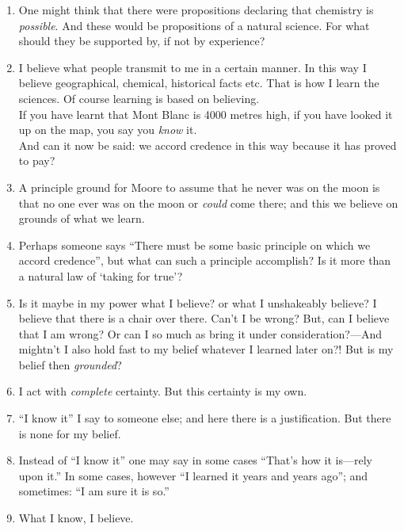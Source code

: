 \documentclass{book}
\begin{document}
\begin{enumerate}
\item
One might think that there were propositions declaring that chemistry is
\emph{possible}. And these would be propositions of a natural science. For what
should they be supported by, if not by experience?

\item
I believe what people transmit to me in a certain manner. In this way I believe
geographical, chemical, historical facts etc. That is how I learn the sciences.
Of course learning is based on believing. \\
If you have learnt that Mont Blanc is 4000 metres high, if you have looked it
up on the map, you say you \emph{know} it. \\
And can it now be said: we accord credence in this way because it has proved to
pay?

\item
A principle ground for Moore to assume that he never was on the moon is that no
one ever was on the moon or \emph{could} come there; and this we believe on
grounds of what we learn.

\item
Perhaps someone says ``There must be some basic principle on which we accord
credence'', but what can such a principle accomplish? Is it more than a natural
law of `taking for true'?

\item
Is it maybe in my power what I believe? or what I unshakeably believe?  I
believe that there is a chair over there. Can't I be wrong? But, can I believe
that I am wrong? Or can I so much as bring it under consideration?---And
mightn't I also hold fast to my belief whatever I learned later on?! But is my
belief then \emph{grounded}?

\item
I act with \emph{complete} certainty. But this certainty is my own.

\item
``I know it'' I say to someone else; and here there is a justification. But
there is none for my belief.

\item
Instead of ``I know it'' one may say in some cases ``That's how it is---rely
upon it.'' In some cases, however ``I learned it years and years ago''; and
sometimes: ``I am sure it is so.''

\item
What I know, I believe.


\end{enumerate}
\end{document}
